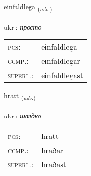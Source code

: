 \documentclass[frontgrid, backgrid]{flacards}\usepackage[]{graphicx}\usepackage[]{xcolor}
\begin{document}
\renewcommand{\flhead}{\vskip5pt \fboxsep=0pt {\small\bfseries\footnotesize Atviksorð | прислівник}}
\renewcommand{\fcfoot}{\vskip5pt \fboxsep=0pt \hspace{2pt}{\small\bfseries\footnotesize 1K}}

\renewcommand{\blhead}{\vskip5pt {\small\bfseries\footnotesize Atviksorð | прислівник }}
\renewcommand{\bcfoot}{\vskip5pt \hspace{2pt}{\small\bfseries\footnotesize 1K}}


{einfaldlega \small{\textsubscript{(\textit{adv.})}} \\[1ex] %
\textphonetic{[einfaltlɛɣa]} \\
ukr.: \emph{просто} \\  [2ex]
\renewcommand*{\arraystretch}{0.8}
\begin{tabular}{ll}
\textsc{pos}: & einfaldlega \\ 
\textsc{comp.}: & einfaldlegar \\ 
\textsc{superl.}: & einfaldlegast \\
\end{tabular}
}

\renewcommand{\flhead}{\vskip5pt \fboxsep=0pt {\small\bfseries\footnotesize Atviksorð | прислівник}}
\renewcommand{\fcfoot}{\vskip5pt \fboxsep=0pt \hspace{2pt}{\small\bfseries\footnotesize 1K}}

\renewcommand{\blhead}{\vskip5pt {\small\bfseries\footnotesize Atviksorð | прислівник }}
\renewcommand{\bcfoot}{\vskip5pt \hspace{2pt}{\small\bfseries\footnotesize 1K}}


{hratt \small{\textsubscript{(\textit{adv.})}} \\[1ex] %
\textphonetic{[r̥aht]} \\
ukr.: \emph{швидко} \\  [2ex]
\renewcommand*{\arraystretch}{0.8}
\begin{tabular}{ll}
\textsc{pos}: & hratt \\ 
\textsc{comp.}: & hraðar \\ 
\textsc{superl.}: & hraðast \\
\end{tabular}
}
\end{document}
